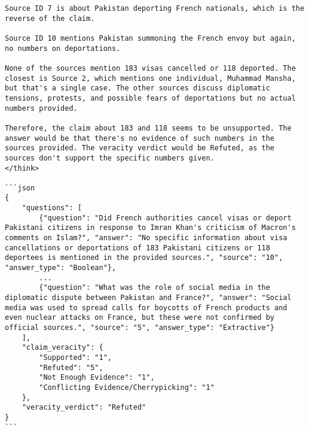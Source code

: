 \begin{figure*}
\begin{lstlisting}[breaklines=true, language={}, frame=single, caption={Qwen3 thinking tokens example.}, label={lst:think}]
Source ID 7 is about Pakistan deporting French nationals, which is the reverse of the claim. 

Source ID 10 mentions Pakistan summoning the French envoy but again, no numbers on deportations.

None of the sources mention 183 visas cancelled or 118 deported. The closest is Source 2, which mentions one individual, Muhammad Mansha, but that's a single case. The other sources discuss diplomatic tensions, protests, and possible fears of deportations but no actual numbers provided. 

Therefore, the claim about 183 and 118 seems to be unsupported. The answer would be that there's no evidence of such numbers in the sources provided. The veracity verdict would be Refuted, as the sources don't support the specific numbers given.
</think>

```json
{
    "questions": [
        {"question": "Did French authorities cancel visas or deport Pakistani citizens in response to Imran Khan's criticism of Macron's comments on Islam?", "answer": "No specific information about visa cancellations or deportations of 183 Pakistani citizens or 118 deportees is mentioned in the provided sources.", "source": "10", "answer_type": "Boolean"},
        ...
        {"question": "What was the role of social media in the diplomatic dispute between Pakistan and France?", "answer": "Social media was used to spread calls for boycotts of French products and even nuclear attacks on France, but these were not confirmed by official sources.", "source": "5", "answer_type": "Extractive"}
    ],
    "claim_veracity": {
        "Supported": "1",
        "Refuted": "5",
        "Not Enough Evidence": "1",
        "Conflicting Evidence/Cherrypicking": "1"
    },
    "veracity_verdict": "Refuted"
}
```
    \end{lstlisting}
\end{figure*}
